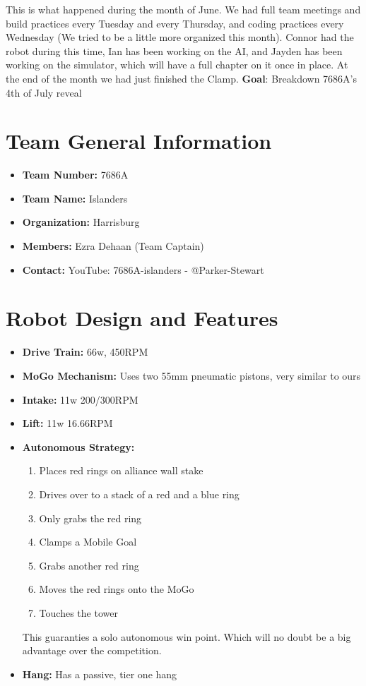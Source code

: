 This is what happened during the month of June. We had full team meetings and build practices every Tuesday and every Thursday, and coding practices every Wednesday (We tried to be a little more organized this month). Connor had the robot during this time, Ian has been working on the AI, and Jayden has been working on the simulator, which will have a full chapter on it once in place. At the end of the month we had just finished the Clamp. 
\textbf{Goal}: Breakdown 7686A's 4th of July reveal

\section*{Team General Information}
\begin{itemize}
    \item \textbf{Team Number:} 7686A
    \item \textbf{Team Name:} Islanders
    \item \textbf{Organization:} Harrisburg
    \item \textbf{Members:} Ezra Dehaan (Team Captain)
    \item \textbf{Contact:} YouTube: 7686A-islanders - @Parker-Stewart
\end{itemize}

\section*{Robot Design and Features}
\begin{itemize}
    \item \textbf{Drive Train:} 66w, 450RPM
    \item \textbf{MoGo Mechanism:} Uses two 55mm pneumatic pistons, very similar to ours
    \item \textbf{Intake:} 11w 200/300RPM 
    \item \textbf{Lift:} 11w 16.66RPM 
    \item \textbf{Autonomous Strategy:} 
    \begin{enumerate}
        \item Places red rings on alliance wall stake
        \item Drives over to a stack of a red and a blue ring
        \item Only grabs the red ring 
        \item Clamps a Mobile Goal
        \item Grabs another red ring
        \item Moves the red rings onto the MoGo
        \item Touches the tower
    \end{enumerate}
    This guaranties a solo autonomous win point. Which will no doubt be a big advantage over the competition.
    \item \textbf{Hang:} Has a passive, tier one hang
\end{itemize}

